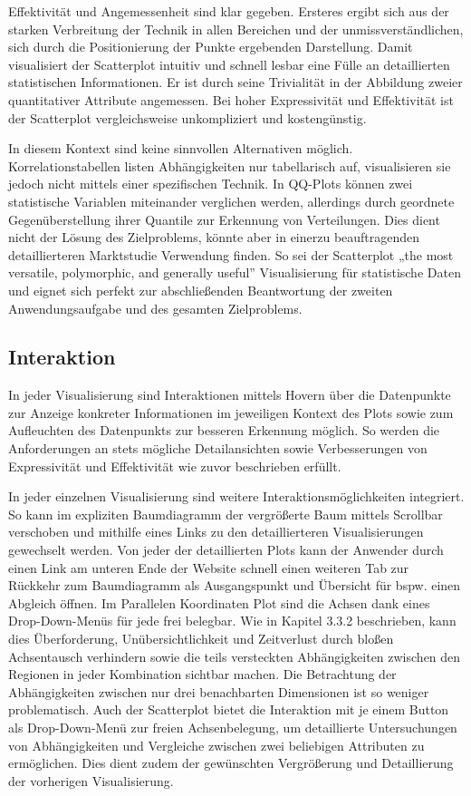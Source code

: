 \documentclass[usegeometry=true]{scrartcl}
\begin{document}
Effektivität und Angemessenheit sind klar gegeben. 
Ersteres ergibt sich aus der starken Verbreitung der Technik in allen Bereichen und der unmissverständlichen, sich durch die Positionierung der Punkte ergebenden Darstellung. 
Damit visualisiert der Scatterplot intuitiv und schnell lesbar eine Fülle an detaillierten statistischen Informationen.
Er ist durch seine Trivialität in der Abbildung zweier quantitativer Attribute angemessen. 
Bei hoher Expressivität und Effektivität ist der Scatterplot vergleichsweise unkompliziert und kostengünstig.

In diesem Kontext sind keine sinnvollen Alternativen möglich. 
Korrelationstabellen listen Abhängigkeiten nur tabellarisch auf, visualisieren sie jedoch nicht mittels einer spezifischen Technik.
In QQ-Plots können zwei statistische Variablen miteinander verglichen werden, allerdings durch geordnete Gegenüberstellung ihrer Quantile zur Erkennung von Verteilungen.
Dies dient nicht der Lösung des Zielproblems, könnte aber in einerzu beauftragenden detaillierteren Marktstudie Verwendung finden.
So sei der Scatterplot „the most versatile, polymorphic, and generally useful”\cite[103]{Friendly.2005} Visualisierung für statistische Daten und 
eignet sich perfekt zur abschließenden Beantwortung der zweiten Anwendungsaufgabe und des gesamten Zielproblems.

\subsection{Interaktion}
In jeder Visualisierung sind Interaktionen mittels Hovern über die Datenpunkte zur Anzeige konkreter Informationen im jeweiligen Kontext des Plots 
sowie zum Aufleuchten des Datenpunkts zur besseren Erkennung möglich.
So werden die Anforderungen an stets mögliche Detailansichten sowie Verbesserungen von Expressivität und Effektivität wie zuvor beschrieben erfüllt. 

In jeder einzelnen Visualisierung sind weitere Interaktionsmöglichkeiten integriert. 
So kann im expliziten Baumdiagramm der vergrößerte Baum mittels Scrollbar verschoben und mithilfe eines Links zu den detaillierteren Visualisierungen gewechselt werden.
Von jeder der detaillierten Plots kann der Anwender durch einen Link am unteren Ende der Website schnell einen weiteren Tab zur Rückkehr zum Baumdiagramm als Ausgangspunkt und Übersicht für bspw. einen Abgleich öffnen.
Im Parallelen Koordinaten Plot sind die Achsen dank eines Drop-Down-Menüs für jede frei belegbar. 
Wie in Kapitel 3.3.2 beschrieben, kann dies Überforderung, Unübersichtlichkeit und Zeitverlust durch bloßen Achsentausch verhindern 
sowie die teils versteckten Abhängigkeiten zwischen den Regionen in jeder Kombination sichtbar machen. 
Die Betrachtung der Abhängigkeiten zwischen nur drei benachbarten Dimensionen ist so weniger problematisch.
Auch der Scatterplot bietet die Interaktion mit je einem Button als Drop-Down-Menü zur freien Achsenbelegung, 
um detaillierte Untersuchungen von Abhängigkeiten und Vergleiche zwischen zwei beliebigen Attributen zu ermöglichen.
Dies dient zudem der gewünschten Vergrößerung und Detaillierung der vorherigen Visualisierung.
\end{document}
